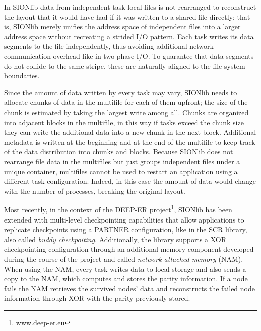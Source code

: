 In SIONlib data from independent task-local files is not rearranged to reconstruct the layout that it would have had if it was written to a shared file directly; that is, SIONlib merely unifies the address space
of independent files into a larger address space without recreating a strided I/O pattern. Each task writes its data segments to the file independently, thus avoiding additional network communication overhead 
like in two phase I/O. To guarantee that data segments do not collide to the same stripe, these are naturally aligned to the file system boundaries. 

Since the amount of data written by every task may vary, SIONlib 
needs to allocate chunks of data in the multifile for each of them upfront; the size of the chunk is estimated by taking the largest write among all. Chunks are organized into adjacent blocks in the multifile, in this 
way if tasks exceed the chunk size they can write the additional data into a new chunk in the next block. Additional metadata is written at the beginning and at the end of the multifile to keep track of the data 
distribution into chunks and blocks. Because SIONlib does not rearrange file data in the multifiles but just groups independent files under a unique container, multifiles cannot be used to restart an application using 
a different task configuration. Indeed, in this case the amount of data would change with the number of processes, breaking the original layout.

Most recently, in the context of the DEEP-ER project\footnote{www.deep-er.eu}, SIONlib has been extended with multi-level checkpointing capabilities that allow applications to replicate checkpoints using a PARTNER 
configuration, like in the SCR library, also called \textit{buddy checkpoiting}. Additionally, the library supports a XOR checkpointing configuration through an additional memory component developed during the course 
of the project and called \textit{network attached memory} (NAM). When using the NAM, every task writes data to local storage and also sends a copy to the NAM, which computes and stores the parity information. If a node 
fails the NAM retrieves the survived nodes' data and reconstructs the failed node information through XOR with the parity previously stored.

